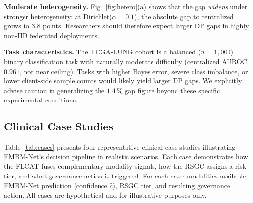 \documentclass{ieeeaccess}
\begin{document}
\textbf{Moderate heterogeneity.} Fig.~\ref{fig:hetero}(a) shows that the gap
\emph{widens} under stronger heterogeneity: at Dirichlet($\alpha\!=\!0.1$),
the absolute gap to centralized grows to 3.8 points. Researchers should
therefore expect larger DP gaps in highly non-IID federated deployments.

\textbf{Task characteristics.} The TCGA-LUNG cohort is a balanced ($n\!=\!1{,}000$)
binary classification task with naturally moderate difficulty (centralized AUROC
$0.961$, not near ceiling). Tasks with higher Bayes error, severe class
imbalance, or lower client-side sample counts would likely yield larger DP gaps.
We explicitly advise caution in generalizing the $1.4\,\%$ gap figure beyond
these specific experimental conditions.

\subsection{Clinical Case Studies}
\label{subsec:clinical}

Table~\ref{tab:cases} presents four representative clinical case studies illustrating FMBM-Net's decision pipeline in realistic scenarios. Each case demonstrates how the FLCAT fuses complementary modality signals, how the RSGC assigns a risk tier, and what governance action is triggered.  For each case:
modalities available, FMBM-Net prediction (confidence $\hat{c}$), RSGC tier, and resulting governance action. All cases are hypothetical and for illustrative purposes only.
\end{document}
